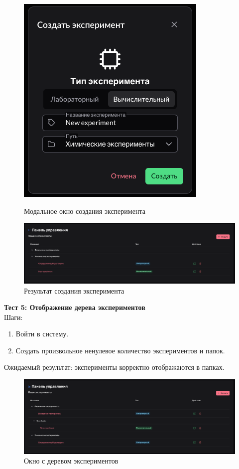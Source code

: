 \documentclass[a4paper,12pt,reqno]{article}
\begin{document}
    \begin{figure}[H]
        \centering
        \includegraphics[width=0.5\linewidth]{img/create_experiment_modal.png}
        \caption{Модальное окно создания эксперимента}
        \includegraphics[width=\linewidth]{img/create_experiment_result.png}
        \caption{Результат создания эксперимента}
    \end{figure}
    \vspace{0.5cm}

    \textbf{Тест 5: Отображение дерева экспериментов}\\
    Шаги:
    \begin{enumerate}
        \item Войти в систему.
        \item Создать произвольное ненулевое количество экспериментов и папок.
    \end{enumerate}
    Ожидаемый результат: эксперименты корректно отображаются в папках.
    
    \begin{figure}[H]
        \centering
        \includegraphics[width=\linewidth]{img/experiments_tree.png}
        \caption{Окно с деревом экспериментов}
    \end{figure}
    \vspace{0.5cm}
\end{document}
